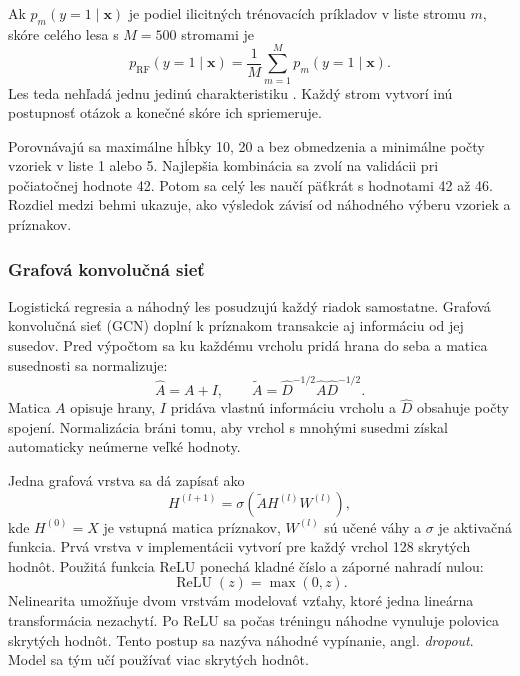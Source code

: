 Ak $p_m(y=1\mid\mathbf{x})$ je podiel ilicitných trénovacích príkladov
v liste stromu $m$, skóre celého lesa s $M=500$ stromami je
\begin{equation}
  p_{\mathrm{RF}}(y=1\mid\mathbf{x})
  =\frac{1}{M}\sum_{m=1}^{M}p_m(y=1\mid\mathbf{x}).
  \label{eq:rf-average}
\end{equation}
Les teda nehľadá jednu jedinú charakteristiku . Každý
strom vytvorí inú postupnosť otázok a konečné skóre ich spriemeruje.

Porovnávajú sa maximálne hĺbky 10, 20 a bez obmedzenia a minimálne
počty vzoriek v liste 1 alebo 5. Najlepšia kombinácia sa zvolí na
validácii pri počiatočnej hodnote 42. Potom sa celý les naučí päťkrát
s hodnotami 42 až 46. Rozdiel medzi behmi ukazuje, ako výsledok závisí
od náhodného výberu vzoriek a príznakov.

\subsubsection{Grafová konvolučná sieť}

Logistická regresia a náhodný les posudzujú každý riadok samostatne.
Grafová konvolučná sieť (GCN) doplní k príznakom transakcie aj
informáciu od jej susedov. Pred výpočtom sa ku každému vrcholu pridá
hrana do seba a matica susednosti sa normalizuje:
\begin{equation}
  \hat{A}=A+I,\qquad
  \tilde{A}=\hat{D}^{-1/2}\hat{A}\hat{D}^{-1/2}.
\end{equation}
Matica $A$ opisuje hrany, $I$ pridáva vlastnú informáciu vrcholu a
$\hat{D}$ obsahuje počty spojení. Normalizácia bráni tomu, aby vrchol s
mnohými susedmi získal automaticky neúmerne veľké hodnoty.

Jedna grafová vrstva sa dá zapísať ako
\begin{equation}
  H^{(l+1)}=\sigma\!\left(\tilde{A}H^{(l)}W^{(l)}\right),
  \label{eq:gcn-layer}
\end{equation}
kde $H^{(0)}=X$ je vstupná matica príznakov, $W^{(l)}$ sú učené váhy a
$\sigma$ je aktivačná funkcia. Prvá vrstva v implementácii vytvorí pre
každý vrchol 128 skrytých hodnôt. Použitá funkcia ReLU ponechá kladné
číslo a záporné nahradí nulou:
\begin{equation}
  \operatorname{ReLU}(z)=\max(0,z).
  \label{eq:relu}
\end{equation}
Nelinearita umožňuje dvom vrstvám modelovať vzťahy, ktoré jedna
lineárna transformácia nezachytí. Po ReLU sa počas tréningu náhodne vynuluje polovica
skrytých hodnôt. Tento postup sa nazýva náhodné vypínanie, angl.
\emph{dropout}. Model sa tým učí používať viac skrytých hodnôt.

